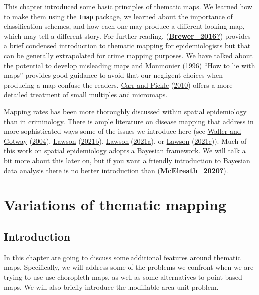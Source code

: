 \documentclass[
]{book}
\begin{document}
This chapter introduced some basic principles of thematic maps. We learned how to make them using the \texttt{tmap} package, we learned about the importance of classification schemes, and how each one may produce a different looking map, which may tell a different story. For further reading, (\protect\hyperlink{ref-Brewer_2016}{\textbf{Brewer\_2016?}}) provides a brief condensed introduction to thematic mapping for epidemiologists but that can be generally extrapolated for crime mapping purposes. We have talked about the potential to develop misleading maps and \protect\hyperlink{ref-Monmonier_1996}{Monmonier} (\protect\hyperlink{ref-Monmonier_1996}{1996}) ``How to lie with maps'' provides good guidance to avoid that our negligent choices when producing a map confuse the readers. \protect\hyperlink{ref-Carr_2010}{Carr and Pickle} (\protect\hyperlink{ref-Carr_2010}{2010}) offers a more detailed treatment of small multiples and micromaps.

Mapping rates has been more thoroughly discussed within spatial epidemiology than in criminology. There is ample literature on disease mapping that address in more sophisticated ways some of the issues we introduce here (see \protect\hyperlink{ref-Waller_2004}{Waller and Gotway} (\protect\hyperlink{ref-Waller_2004}{2004}), \protect\hyperlink{ref-Lawson_2006}{Lawson} (\protect\hyperlink{ref-Lawson_2006}{2021b}), \protect\hyperlink{ref-Lawson_2021a}{Lawson} (\protect\hyperlink{ref-Lawson_2021a}{2021a}), or \protect\hyperlink{ref-Lawson_2021b}{Lawson} (\protect\hyperlink{ref-Lawson_2021b}{2021c})). Much of this work on spatial epidemiology adopts a Bayesian framework. We will talk a bit more about this later on, but if you want a friendly introduction to Bayesian data analysis there is no better introduction than (\protect\hyperlink{ref-McElreath_2020}{\textbf{McElreath\_2020?}}).

\hypertarget{variations-of-thematic-mapping}{%
\chapter{Variations of thematic mapping}\label{variations-of-thematic-mapping}}

\hypertarget{introduction-3}{%
\section{Introduction}\label{introduction-3}}

In this chapter are going to discuss some additional features around thematic maps. Specifically, we will address some of the problems we confront when we are trying to use use choropleth maps, as well as some alternatives to point based maps. We will also briefly introduce the modifiable area unit problem.
\end{document}
